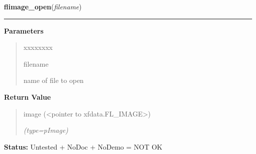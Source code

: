 \hspace{.8\funcindent}\begin{boxedminipage}{\funcwidth}

    \raggedright \textbf{flimage\_open}(\textit{filename})

    \vspace{-1.5ex}

    \rule{\textwidth}{0.5\fboxrule}
\setlength{\parskip}{2ex}
\setlength{\parskip}{1ex}
      \textbf{Parameters}
      \vspace{-1ex}

      \begin{quote}
        \begin{Ventry}{xxxxxxxx}

          \item[filename]

          name of file to open

        \end{Ventry}

      \end{quote}

      \textbf{Return Value}
    \vspace{-1ex}

      \begin{quote}
      image ({\textless}pointer to xfdata.FL\_IMAGE{\textgreater})

      {\it (type=pImage)}

      \end{quote}

\textbf{Status:} Untested + NoDoc + NoDemo = NOT OK



    \end{boxedminipage}

    \label{xformslib:flflimage:flimage_read_annotation}

    \vspace{0.5ex}

